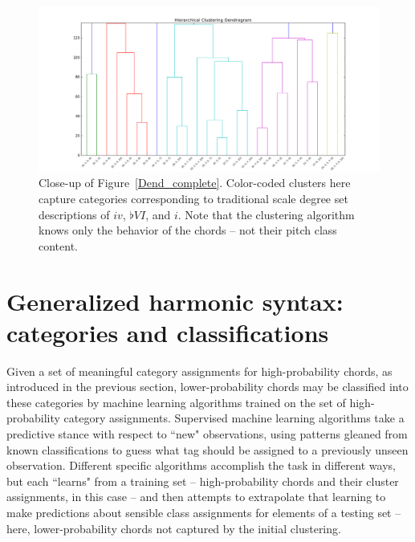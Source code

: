 \begin{figure}
	\centering
	\includegraphics[width=6in]{Dend_iv_bVI_i.png}
	\caption{Close-up of Figure~\ref{Dend_complete}.  Color-coded clusters here capture categories corresponding to traditional scale degree set descriptions of $iv$, $\flat VI$, and $i$.  Note that the clustering algorithm knows only the behavior of the chords -- not their pitch class content.}
	\label{Dend_sub3}
\end{figure}

\section{Generalized harmonic syntax: categories and classifications}
Given a set of meaningful category assignments for high-probability chords, as introduced in the previous section, lower-probability chords may be classified into these categories by machine learning algorithms trained on the set of high-probability category assignments.  Supervised machine learning algorithms take a predictive stance with respect to ``new" observations, using patterns gleaned from known classifications to guess what tag should be assigned to a previously unseen observation.  Different specific algorithms accomplish the task in different ways, but each ``learns" from a training set -- high-probability chords and their cluster assignments, in this case -- and then attempts to extrapolate that learning to make predictions about sensible class assignments for elements of a testing set -- here, lower-probability chords not captured by the initial clustering.

